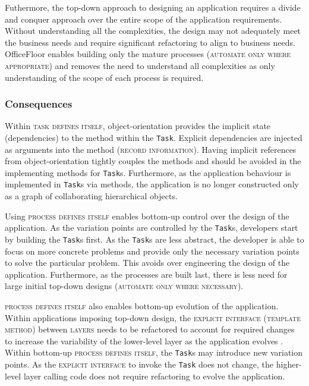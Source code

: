 \documentclass[prodmode]{style/acmlarge}
\begin{document}
Futhermore, the top-down approach to designing an application requires a divide
and conquer approach over the entire scope of the application requirements.
Without understanding all the complexities, the design may not adequately meet
the business needs and require significant refactoring to align to business
needs.  OfficeFloor enables building only the mature processes (\textsc{automate
only where appropriate}) and removes the need to understand all complexities as
only understanding of the scope of each process is required.


\subsubsection*{Consequences}

Within \textsc{task defines itself}, object-orientation provides the implicit
state (dependencies) to the method within the \texttt{Task}.  Explicit
dependencies are injected as arguments into the method (\textsc{record
information}).  Having implicit references from object-orientation tightly
couples the methods and should be avoided in the implementing methods for
\texttt{Task}s.  Furthermore, as the application behaviour is implemented in
\texttt{Task}s via methods, the application is no longer constructed only as a
graph of collaborating hierarchical objects.

Using \textsc{process defines itself} enables bottom-up control over the design
of the application.  As the variation points are controlled by the
\texttt{Task}s, developers start by building the \texttt{Task}s first.  As
the \texttt{Task}s are less abstract, the developer is able to focus on more
concrete problems and provide only the necessary variation points to solve the
particular problem.  This avoids over engineering the design of the application.
 Furthermore, as the processes are built last, there is less need for large
initial top-down designs (\textsc{automate only where necessary}).

\textsc{process defines itself} also enables bottom-up evolution of the
application.  Within applications imposing top-down design, the
\textsc{explicit interface} (\textsc{template method}) between \textsc{layers}
needs to be refactored to account for required changes to increase the
variability of the lower-level layer as the application evolves \cite{ioc}.
Within bottom-up \textsc{process defines itself}, the \texttt{Task}s may
introduce new variation points.  As the \textsc{explicit interface} to invoke
the \texttt{Task} does not change, the higher-level layer calling code does not
require refactoring to evolve the application.
\end{document}
